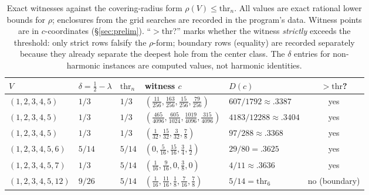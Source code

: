 \begin{table}[htbp]
\centering
\footnotesize
\caption{Exact witnesses against the covering-radius form
$\rho(V)\le\mathrm{thr}_n$. All values are exact rational lower bounds
for $\rho$; enclosures from the grid searches are recorded in the
program's data. Witness points are in $c$-coordinates
(\S\ref{sec:prelim}). ``$>\mathrm{thr}$?'' marks whether the witness
\emph{strictly} exceeds the threshold: only strict rows falsify the
$\rho$-form; boundary rows (equality) are recorded separately because
they already separate the deepest hole from the center class. The
$\delta$ entries for non-harmonic instances are computed values, not
harmonic identities.}
\label{tab:refute}
\begin{tabularx}{\textwidth}{@{} l l l >{\raggedright\arraybackslash}X l c @{}}
\toprule
$V$ & $\delta=\tfrac12-\lambda$ & $\mathrm{thr}_n$ & witness $c$ &
$D(c)$ & $>\mathrm{thr}$? \\
\midrule
$(1,2,3,4,5)$ & $1/3$ & $1/3$ &
$(\tfrac{11}{256},\tfrac{163}{256},\tfrac{15}{256},\tfrac{79}{256})$ &
$607/1792{\approx}.3387$ & yes \\
$(1,2,3,4,5)$ & $1/3$ & $1/3$ &
$(\tfrac{465}{4096},\tfrac{605}{1024},\tfrac{1019}{4096},
\tfrac{315}{4096})$ &
$4183/12288{\approx}.3404$ & yes \\
$(1,2,3,4,5)$ & $1/3$ & $1/3$ &
$(\tfrac1{32},\tfrac{15}{32},\tfrac3{32},\tfrac78)$ &
$97/288{\approx}.3368$ & yes \\
$(1,2,3,4,5,6)$ & $5/14$ & $5/14$ &
$(0,\tfrac5{16},\tfrac{15}{16},\tfrac34,\tfrac12)$ & $29/80=.3625$ &
yes \\
$(1,2,3,4,5,7)$ & $1/3$ & $5/14$ &
$(\tfrac1{16},\tfrac9{16},0,\tfrac38,0)$ & $4/11{\approx}.3636$ & yes
\\
$(1,2,3,4,5,12)$ & $9/26$ & $5/14$ &
$(\tfrac1{16},\tfrac{11}{16},\tfrac18,\tfrac7{16},\tfrac78)$ &
$5/14=\mathrm{thr}_6$ & no (boundary) \\
\bottomrule
\end{tabularx}
\end{table}

